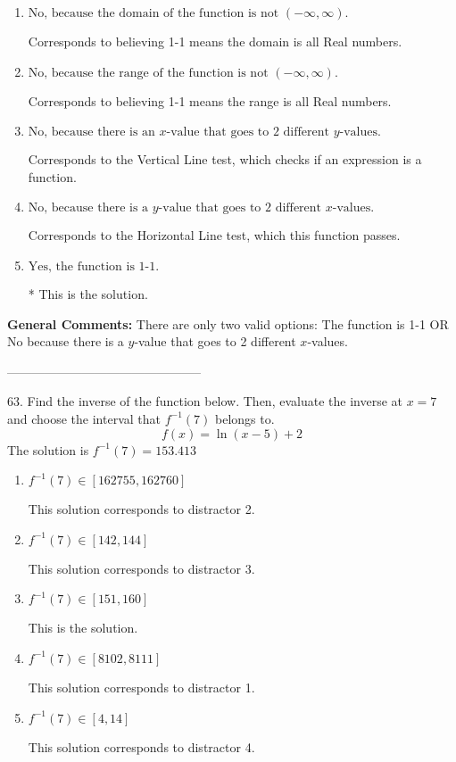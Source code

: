 \documentclass{extbook}[14pt]
\begin{document}
\begin{enumerate}[label=\Alph*.] 
\item $ \text{No, because the domain of the function is not $(-\infty, \infty)$.} $ 

 Corresponds to believing 1-1 means the domain is all Real numbers. 
\item $ \text{No, because the range of the function is not $(-\infty, \infty)$.} $ 

 Corresponds to believing 1-1 means the range is all Real numbers. 
\item $ \text{No, because there is an $x$-value that goes to 2 different $y$-values.} $ 

 Corresponds to the Vertical Line test, which checks if an expression is a function. 
\item $ \text{No, because there is a $y$-value that goes to 2 different $x$-values.} $ 

 Corresponds to the Horizontal Line test, which this function passes. 
\item $ \text{Yes, the function is 1-1.} $ 

 * This is the solution. 
\end{enumerate} 
 
\textbf{General Comments:} There are only two valid options: The function is 1-1 OR No because there is a $y$-value that goes to 2 different $x$-values.

-----------------------------------------------

63. Find the inverse of the function below. Then, evaluate the inverse at $x = 7$ and choose the interval that $f^{-1}(7)$ belongs to.
\[ f(x) = \ln{(x-5)}+2 \] 
The solution is $ f^{-1}(7) = 153.413 $ 

\begin{enumerate}[label=\Alph*.] 
\item $ f^{-1}(7) \in [162755, 162760] $ 

  This solution corresponds to distractor 2. 
\item $ f^{-1}(7) \in [142, 144] $ 

  This solution corresponds to distractor 3. 
\item $ f^{-1}(7) \in [151, 160] $ 

  This is the solution. 
\item $ f^{-1}(7) \in [8102, 8111] $ 

  This solution corresponds to distractor 1. 
\item $ f^{-1}(7) \in [4, 14] $ 

  This solution corresponds to distractor 4. 
\end{enumerate} 
 
\end{document}
